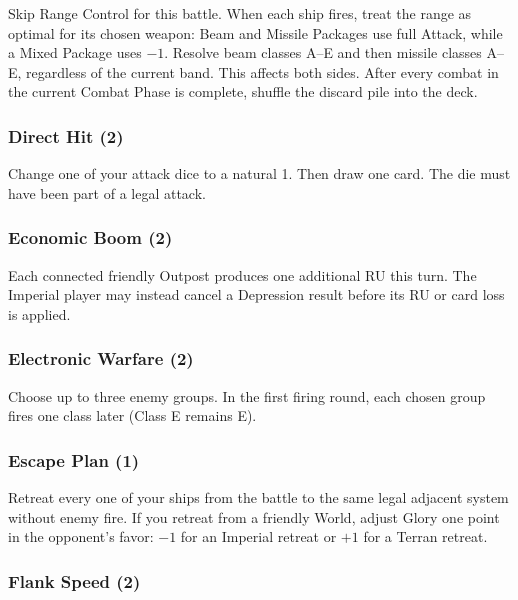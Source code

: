  Skip Range Control
for this battle. When each ship fires, treat the range as optimal for its
chosen weapon:
Beam and Missile Packages use full Attack, while a Mixed Package uses $-1$.
Resolve beam classes A--E and then missile classes A--E, regardless of the
current band. This affects both sides. After every combat in the current Combat
Phase is complete, shuffle the discard pile into the deck.

\subsubsection{Direct Hit (2)}

 Change one of your attack dice to a
natural 1. Then draw one card. The die must have been part of a legal attack.

\subsubsection{Economic Boom (2)}

 Each connected
friendly Outpost produces one additional RU this turn. The Imperial player may
instead cancel a Depression result before its RU or card loss is applied.

\subsubsection{Electronic Warfare (2)}

 Choose up to three enemy
groups. In the first firing round, each chosen group fires one class later
(Class E remains E).

\subsubsection{Escape Plan (1)}

 Retreat every one of your ships
from the battle to the same legal adjacent system without enemy fire. If you
retreat from a friendly World, adjust Glory one point in the opponent's favor:
$-1$ for an Imperial retreat or $+1$ for a Terran retreat.

\subsubsection{Flank Speed (2)}

